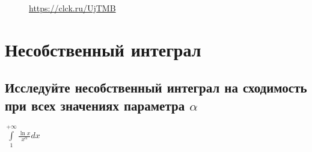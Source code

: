 \documentclass{article}
\begin{document}
\begin{figure}[h!]
\caption*{\url{https://clck.ru/UjTMB}}
\end{figure}
\newpage
\Large
\section{Несобственный интеграл}
\normalsize
\subsection{Исследуйте несобственный интеграл на сходимость при всех значениях параметра $ \alpha $}
\large $ \int\limits^{+\infty}_{1} \frac{\ln{x}}{x^{\alpha}}dx $\\
\normalsize
\end{document}
